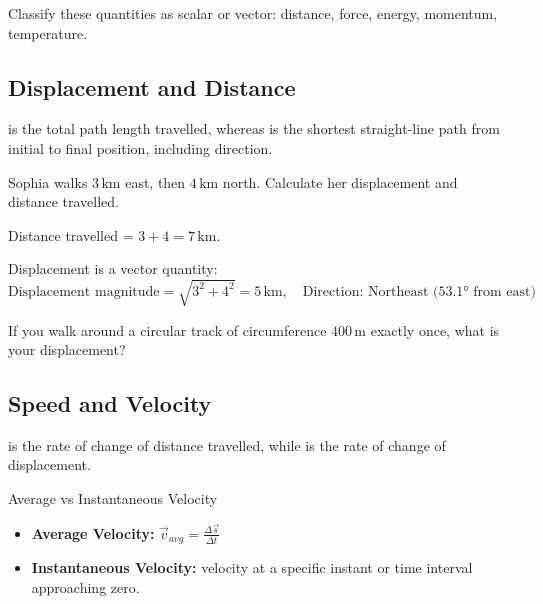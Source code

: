 \begin{stopandthink}
Classify these quantities as scalar or vector: distance, force, energy, momentum, temperature.
\end{stopandthink}

\subsection{Displacement and Distance}
\FloatBarrier

 is the total path length travelled, whereas  is the shortest straight-line path from initial to final position, including direction.

\begin{example}
Sophia walks $3\,\mathrm{km}$ east, then $4\,\mathrm{km}$ north. Calculate her displacement and distance travelled.
\end{example}

\begin{solution}
Distance travelled = $3 + 4 = 7\,\mathrm{km}$.

Displacement is a vector quantity:
\[
\text{Displacement magnitude} = \sqrt{3^2 + 4^2} = 5\,\mathrm{km},\quad \text{Direction: Northeast (53.1° from east)}
\]
\end{solution}

\begin{stopandthink}
If you walk around a circular track of circumference $400\,\mathrm{m}$ exactly once, what is your displacement?
\end{stopandthink}

\FloatBarrier

\subsection{Speed and Velocity}
\FloatBarrier

 is the rate of change of distance travelled, while  is the rate of change of displacement.

\begin{marginfigure}[0pt]
\caption{Speed indicates how fast, while velocity includes direction.}
\end{marginfigure}

\begin{keyconcept}{Average vs Instantaneous Velocity}
\begin{itemize}
    \item \textbf{Average Velocity:} $\vec{v}_{avg} = \frac{\Delta \vec{s}}{\Delta t}$
    \item \textbf{Instantaneous Velocity:} velocity at a specific instant or time interval approaching zero.
\end{itemize}
\end{keyconcept}

